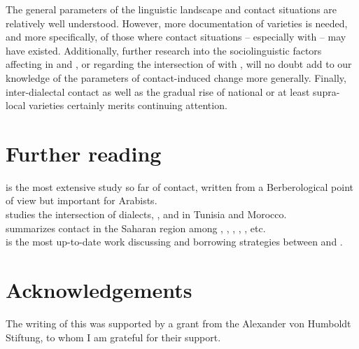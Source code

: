 \documentclass[output=paper]{langsci/langscibook}
\begin{document}
The general parameters of the  linguistic landscape and contact situations are relatively well understood. However, more documentation of  varieties is needed, and more specifically, of those where contact situations -- especially with  -- may have existed. Additionally, further research into the sociolinguistic factors affecting  in  and , or regarding the intersection of  with , will no doubt add to our knowledge of the parameters of contact-induced change more generally. Finally, inter-dialectal contact as well as the gradual rise of national or at least supra-local varieties certainly merits continuing attention.

\section*{Further reading}

\citet{Kossmann2013book} is the most extensive study so far of \textendash {} contact, written from a Berberological point of view but important for Arabists.\\
\citet{Sayahi2014} studies the intersection of dialects,  ,  and  in Tunisia and Morocco.\\
\citet{Souag2016sahara} summarizes contact in the Saharan region among , , , , , etc.\\
\citet{Ziamari2008} is the most up-to-date work discussing  and borrowing strategies between   and .

\section*{Acknowledgements}
The writing of this  was supported by a grant from the Alexander von Humboldt Stiftung, to whom I am grateful for their support.
\end{document}
